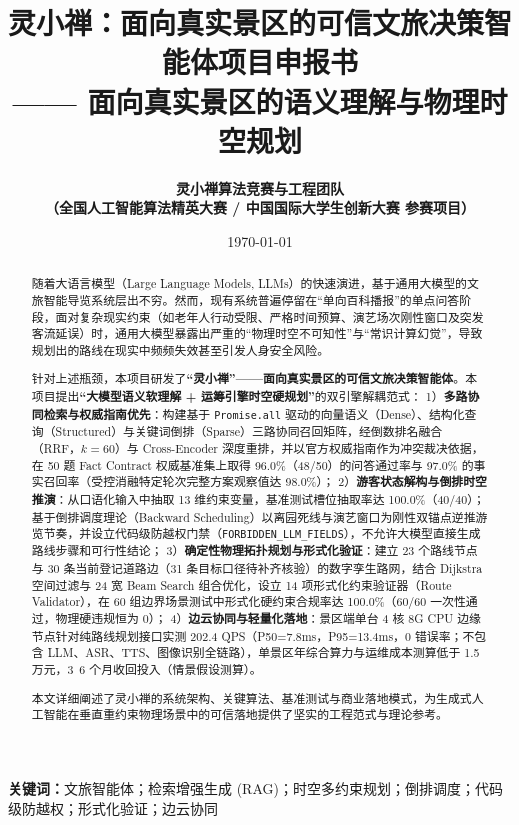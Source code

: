 \documentclass[11pt,a4paper]{ctexart}
\title{\LARGE\bfseries 灵小禅：面向真实景区的可信文旅决策智能体项目申报书\\
\large —— 面向真实景区的语义理解与物理时空规划}
\author{\bfseries 灵小禅算法竞赛与工程团队\\
\small（全国人工智能算法精英大赛 / 中国国际大学生创新大赛 参赛项目）}
\date{\today}
\begin{document}
\maketitle

\begin{abstract}
随着大语言模型（Large Language Models, LLMs）的快速演进，基于通用大模型的文旅智能导览系统层出不穷。然而，现有系统普遍停留在“单向百科播报”的单点问答阶段，面对复杂现实约束（如老年人行动受限、严格时间预算、演艺场次刚性窗口及突发客流延误）时，通用大模型暴露出严重的“物理时空不可知性”与“常识计算幻觉”，导致规划出的路线在现实中频频失效甚至引发人身安全风险。

针对上述瓶颈，本项目研发了\textbf{“灵小禅”——面向真实景区的可信文旅决策智能体}。本项目提出\textbf{“大模型语义软理解 + 运筹引擎时空硬规划”}的双引擎解耦范式：
1）\textbf{多路协同检索与权威指南优先}：构建基于 \texttt{Promise.all} 驱动的向量语义（Dense）、结构化查询（Structured）与关键词倒排（Sparse）三路协同召回矩阵，经倒数排名融合（RRF，$k=60$）与 Cross-Encoder 深度重排，并以官方权威指南作为冲突裁决依据，在 50 题 Fact Contract 权威基准集上取得 96.0\%（48/50）的问答通过率与 97.0\% 的事实召回率（受控消融特定轮次完整方案观察值达 98.0\%）；
2）\textbf{游客状态解构与倒排时空推演}：从口语化输入中抽取 13 维约束变量，基准测试槽位抽取率达 100.0\%（40/40）；基于倒排调度理论（Backward Scheduling）以离园死线与演艺窗口为刚性双锚点逆推游览节奏，并设立代码级防越权门禁（\texttt{FORBIDDEN\_LLM\_FIELDS}），不允许大模型直接生成路线步骤和可行性结论；
3）\textbf{确定性物理拓扑规划与形式化验证}：建立 23 个路线节点与 30 条当前登记道路边（31 条目标口径待补齐核验）的数字孪生路网，结合 Dijkstra 空间过滤与 24 宽 Beam Search 组合优化，设立 14 项形式化约束验证器（Route Validator），在 60 组边界场景测试中形式化硬约束合规率达 100.0\%（60/60 一次性通过，物理硬违规恒为 0）；
4）\textbf{边云协同与轻量化落地}：景区端单台 4 核 8G CPU 边缘节点针对纯路线规划接口实测 202.4 QPS（P50=7.8ms，P95=13.4ms，0 错误率；不包含 LLM、ASR、TTS、图像识别全链路），单景区年综合算力与运维成本测算低于 1.5 万元，3~6 个月收回投入（情景假设测算）。

本文详细阐述了灵小禅的系统架构、关键算法、基准测试与商业落地模式，为生成式人工智能在垂直重约束物理场景中的可信落地提供了坚实的工程范式与理论参考。
\end{abstract}

\vspace{0.8em}
\noindent\textbf{关键词：}文旅智能体；检索增强生成 (RAG)；时空多约束规划；倒排调度；代码级防越权；形式化验证；边云协同
\end{document}
